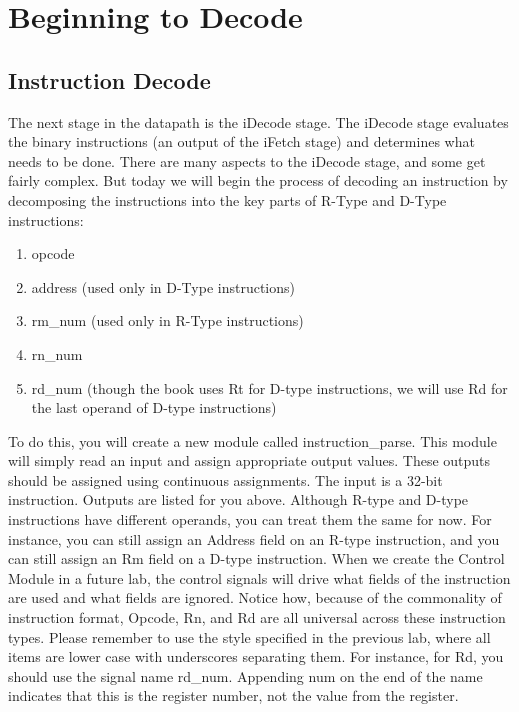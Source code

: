 \chapter{Beginning to Decode}

\section{Instruction Decode}

The next stage in the datapath is the iDecode stage.  The iDecode stage evaluates the binary instructions (an output of the iFetch stage) and determines what needs to be done.  There are many aspects to the iDecode stage, and some get fairly complex.  But today we will begin the process of decoding an instruction by decomposing the instructions into the key parts of R-Type and D-Type instructions:
\begin{enumerate}
	\item opcode
	\item address (used only in D-Type instructions)
	\item rm\_num (used only in R-Type instructions)
	\item rn\_num
	\item rd\_num (though the book uses Rt for D-type instructions, we will use Rd for the last operand of D-type instructions)
\end{enumerate}   

To do this, you will create a new module called instruction\_parse.  This module will simply read an input and assign appropriate output values.  These outputs should be assigned using continuous assignments.  The input is a 32-bit instruction.  Outputs are listed for you above.  Although R-type and D-type instructions have different operands, you can treat them the same for now.  For instance, you can still assign an Address field on an R-type instruction, and you can still assign an Rm field on a D-type instruction.  When we create the Control Module in a future lab, the control signals will drive what fields of the instruction are used and what fields are ignored.  Notice how, because of the commonality of instruction format, Opcode, Rn, and Rd are all universal across these instruction types.  Please remember to use the style specified in the previous lab, where all items are lower case with underscores separating them.  For instance, for Rd, you should use the signal name rd\_num.  Appending num on the end of the name indicates that this is the register number, not the value from the register.

